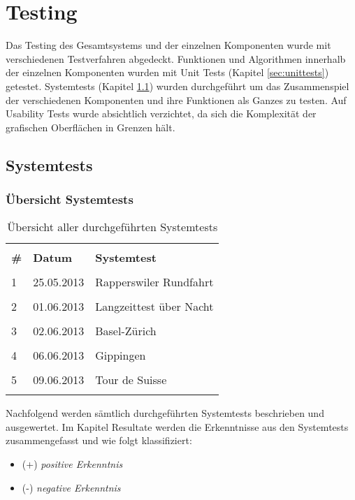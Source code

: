 \section{Testing}
Das Testing des Gesamtsystems und der einzelnen Komponenten wurde mit verschiedenen Testverfahren abgedeckt. Funktionen und Algorithmen innerhalb der einzelnen Komponenten wurden mit Unit Tests (Kapitel \ref{sec:unittests}) getestet. Systemtests (Kapitel \ref{sec:systemtests}) wurden durchgeführt um das Zusammenspiel der verschiedenen Komponenten und ihre Funktionen als Ganzes zu testen. Auf Usability Tests wurde absichtlich verzichtet, da sich die Komplexität der grafischen Oberflächen in Grenzen hält. 

\subsection{Systemtests}
\label{sec:systemtests}

\subsubsection{Übersicht Systemtests}
\begin{longtable}{p{0.3cm}|p{1.8cm}|p{9.3cm}}
& &  \\ [-1.5ex]
\textbf{\#} & \textbf{Datum} & \textbf{Systemtest} \\ [1ex] \hline & &  \\ [-1.5ex]
1 & 25.05.2013 & Rapperswiler Rundfahrt \\ [1ex] \hline & &  \\ [-1.5ex]
2 & 01.06.2013 & Langzeittest über Nacht \\ [1ex] \hline & &  \\ [-1.5ex]
3 & 02.06.2013 & Basel-Zürich \\ [1ex] \hline & &  \\ [-1.5ex]
4 & 06.06.2013 & Gippingen \\ [1ex] \hline & &  \\ [-1.5ex]
5 & 09.06.2013 & Tour de Suisse \\ [1ex]

\caption{Übersicht aller durchgeführten Systemtests}
\end{longtable} 

Nachfolgend werden sämtlich durchgeführten Systemtests beschrieben und ausgewertet. Im Kapitel Resultate werden die Erkenntnisse aus den Systemtests zusammengefasst und wie folgt klassifiziert:
\begin{itemize} [noitemsep,topsep=0pt]
	\item (+) \textit{positive Erkenntnis}
	\item (-) \textit{negative Erkenntnis}
\end{itemize}

